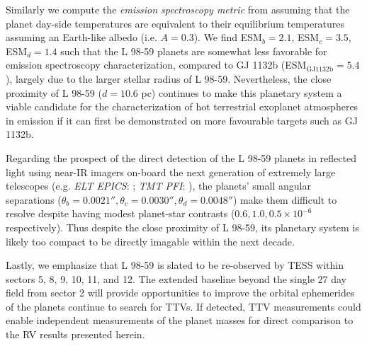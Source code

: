 \documentclass[longauth]{aa}
\begin{document}
Similarly we compute the \emph{emission spectroscopy metric} from \cite{kempton18} assuming that the planet day-side temperatures are equivalent to their equilibrium temperatures assuming an Earth-like albedo (i.e. $A=0.3$). We find ESM$_b=2.1$, ESM$_c=3.5$, ESM$_d=1.4$ such that the L 98-59 planets are somewhat less favorable for emission spectroscopy characterization, compared to GJ 1132b (ESM$_{\text{GJ1132b}}=5.4$), largely due to the larger stellar radius of L 98-59. Nevertheless, the close proximity of L 98-59 ($d=10.6$ pc) continues to make this planetary system a viable candidate for the characterization of hot terrestrial exoplanet atmospheres in emission if it can first be demonstrated on more favourable targets such as GJ 1132b.

Regarding the prospect of the direct detection of the L 98-59 planets in reflected light using near-IR imagers on-board the next generation of extremely large telescopes (e.g. \emph{ELT EPICS}: \citealt{kasper10}; \emph{TMT PFI}: \citealt{macintosh06}), the planets' small angular separations ($\theta_b=0.0021'', \theta_c=0.0030'', \theta_d=0.0048''$) make them difficult to resolve despite having modest planet-star contrasts ($0.6,1.0,0.5 \times 10^{-6}$ respectively). Thus despite the close proximity of L 98-59, its planetary system is likely too compact to be directly imagable within the next decade.

Lastly, we emphasize that L 98-59 is slated to be re-observed by TESS within sectors 5, 8, 9, 10, 11, and 12. The extended baseline beyond the single 27 day field from sector 2 will provide opportunities to improve the orbital ephemerides of the planets continue to search for TTVs. If detected, TTV measurements could enable independent measurements of the planet masses for direct comparison to the RV results presented herein.   
\end{document}
